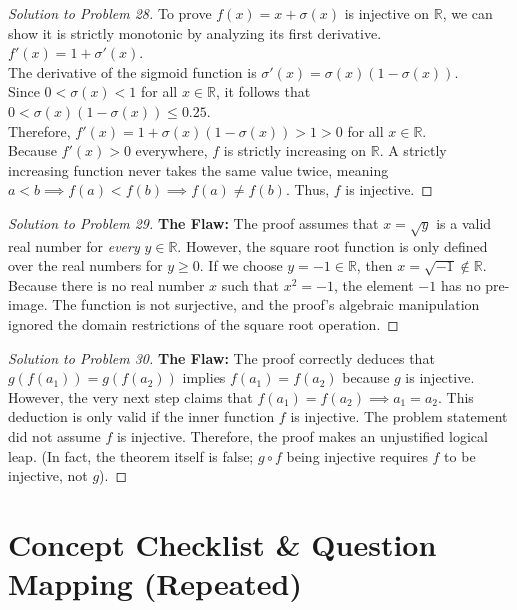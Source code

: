 \documentclass[11pt, letterpaper]{article}
\theoremstyle{definition}
\theoremstyle{remark}
\newcommand{\R}{\mathbb{R}}
\begin{document}
\begin{proof}[Solution to Problem 28]
To prove $f(x) = x + \sigma(x)$ is injective on $\R$, we can show it is strictly monotonic by analyzing its first derivative. \\
$f'(x) = 1 + \sigma'(x)$. \\
The derivative of the sigmoid function is $\sigma'(x) = \sigma(x)(1 - \sigma(x))$. \\
Since $0 < \sigma(x) < 1$ for all $x \in \R$, it follows that $0 < \sigma(x)(1 - \sigma(x)) \le 0.25$. \\
Therefore, $f'(x) = 1 + \sigma(x)(1 - \sigma(x)) > 1 > 0$ for all $x \in \R$. \\
Because $f'(x) > 0$ everywhere, $f$ is strictly increasing on $\R$. A strictly increasing function never takes the same value twice, meaning $a < b \implies f(a) < f(b) \implies f(a) \neq f(b)$. Thus, $f$ is injective.
\end{proof}

\begin{proof}[Solution to Problem 29]
\textbf{The Flaw:} The proof assumes that $x = \sqrt{y}$ is a valid real number for \textit{every} $y \in \R$. However, the square root function is only defined over the real numbers for $y \ge 0$. If we choose $y = -1 \in \R$, then $x = \sqrt{-1} \notin \R$. Because there is no real number $x$ such that $x^2 = -1$, the element $-1$ has no pre-image. The function is not surjective, and the proof's algebraic manipulation ignored the domain restrictions of the square root operation.
\end{proof}

\begin{proof}[Solution to Problem 30]
\textbf{The Flaw:} The proof correctly deduces that $g(f(a_1)) = g(f(a_2))$ implies $f(a_1) = f(a_2)$ because $g$ is injective. However, the very next step claims that $f(a_1) = f(a_2) \implies a_1 = a_2$. This deduction is only valid if the inner function $f$ is injective. The problem statement did not assume $f$ is injective. Therefore, the proof makes an unjustified logical leap. (In fact, the theorem itself is false; $g \circ f$ being injective requires $f$ to be injective, not $g$).
\end{proof}

\newpage

\section{Concept Checklist \& Question Mapping (Repeated)}
\end{document}
